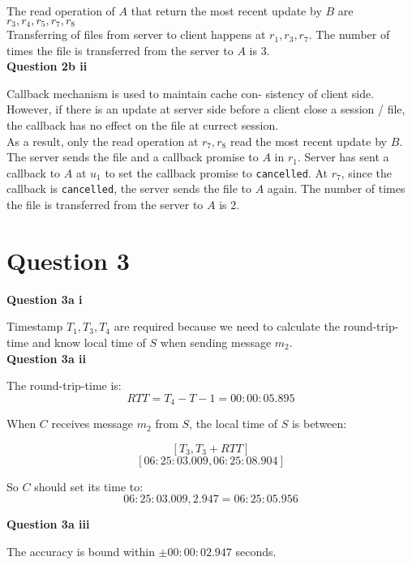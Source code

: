 \documentclass[11pt,a4paper]{report}
\begin{document}
\begin{multicols*}{2}
\noindent The read operation of $A$ that return the most recent update by $B$ are $r_3,r_4,r_5,r_7,r_8$\\

\noindent Transferring of files from server to client happens at $r_1,r_3,r_7$. The number of times the file is transferred from the server to $A$ is 3.\\

\noindent \textbf{Question 2b ii}

\noindent Callback mechanism is used to maintain cache con- sistency of client side. However, if there is an update at server side before a client close a session / file, the callback has no effect on the file at currect session. \\

\noindent As a result, only the read operation at $r_7,r_8$ read the most recent update by $B$. \\

\noindent The server sends the file and a callback promise to $A$ in $r_1$. Server has sent a callback to $A$ at $u_1$ to set the callback promise to \verb|cancelled|. At $r_7$, since the callback is \verb|cancelled|, the server sends the file to $A$ again. The number of times the file is transferred from the server to $A$ is 2. 

\section{Question 3}

\noindent \textbf{Question 3a i}

\noindent Timestamp $T_1,T_3,T_4$ are required because we need to calculate the round-trip-time and know local time of $S$ when sending message $m_2$.\\

\noindent \textbf{Question 3a ii}

\noindent The round-trip-time is:
$$RTT = T_4 - T-1 = 00:00:05.895$$

\noindent When $C$ receives message $m_2$ from $S$, the local time of $S$ is between:

$$[T_3, T_3+RTT]$$
$$[06:25:03.009, 06:25:08.904]$$

\noindent So $C$ should set its time to:
$$06:25:03.009, 2.947 = 06:25:05.956$$

\noindent \textbf{Question 3a iii}

\noindent The accuracy is bound within $\pm 00:00:02.947$ seconds.\\


\end{multicols*}
\end{document}
